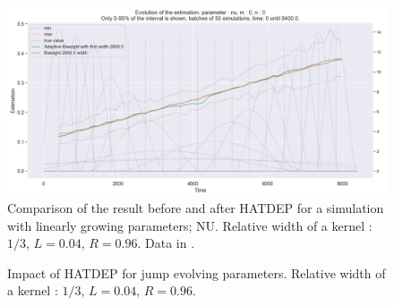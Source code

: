 \begin{figure}
\centering
\includegraphics[width = 0.90 \textwidth]{../imag/chap3/1/F.png}
\caption{Comparison of the result before and after HATDEP for a simulation with linearly growing parameters; NU. Relative width of a kernel : $1/3$, $L = 0.04$, $R = 0.96$. Data in \protect {}.}
\label{fig:first_estimate_1_nu}
\end{figure}

















\begin{figure}
\centering
{} 
\caption{Impact of HATDEP for jump evolving parameters. Relative width of a kernel : $1/3$, $L = 0.04$, $R = 0.96$.}
\label{fig:compar_kernels_2}
\end{figure}

